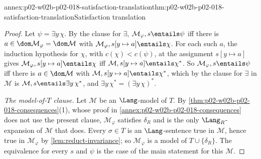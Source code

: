 \begin{annexitem}{annex:p02-w02b-p02-018-satisfaction-translation}{thm:p02-w02b-p02-018-satisfaction-translation}{Satisfaction translation}
\begin{proof}
Let \(\psi=\exists y\,\chi\).  By the clause for \(\exists\),
\(\mathcal M_{\varphi},s\entails\psi\) iff there is
\(a\in\dom\mathcal M_{\varphi}=\dom\mathcal M\) with
\(\mathcal M_{\varphi},s[y\mapsto a]\entails\chi\).  For each such \(a\),
the induction hypothesis for \(\chi\), with \(c(\chi)<c(\psi)\), at the
assignment \(s[y\mapsto a]\) gives
\(\mathcal M_{\varphi},s[y\mapsto a]\entails\chi\) iff
\(\mathcal M,s[y\mapsto a]\entails\chi^{*}\).  So
\(\mathcal M_{\varphi},s\entails\psi\) iff there is \(a\in\dom\mathcal M\)
with \(\mathcal M,s[y\mapsto a]\entails\chi^{*}\), which by the clause for
\(\exists\) in \(\mathcal M\) is \(\mathcal M,s\entails\exists y\,\chi^{*}\),
and \(\exists y\,\chi^{*}=(\exists y\,\chi)^{*}\).

\emph{The model-of-\(T\) clause.}  Let \(\mathcal M\) be an
\(\Lang\)-model of \(T\).  By
\cref{thm:p02-w02b-p02-018-consequences}(1), whose proof in
\cref{annex:p02-w02b-p02-018-consequences} does not use the present clause,
\(\mathcal M_{\varphi}\) satisfies \(\delta_R\) and is the only
\(\Lang_R\)-expansion of \(\mathcal M\) that does.  Every \(\sigma\in T\) is
an \(\Lang\)-sentence true in \(\mathcal M\), hence true in
\(\mathcal M_{\varphi}\) by \cref{lem:reduct-invariance}; so
\(\mathcal M_{\varphi}\) is a model of \(T\cup\{\delta_R\}\).  The
equivalence for every \(s\) and \(\psi\) is the case of the main statement
for this \(\mathcal M\).
\end{proof}
\end{annexitem}


